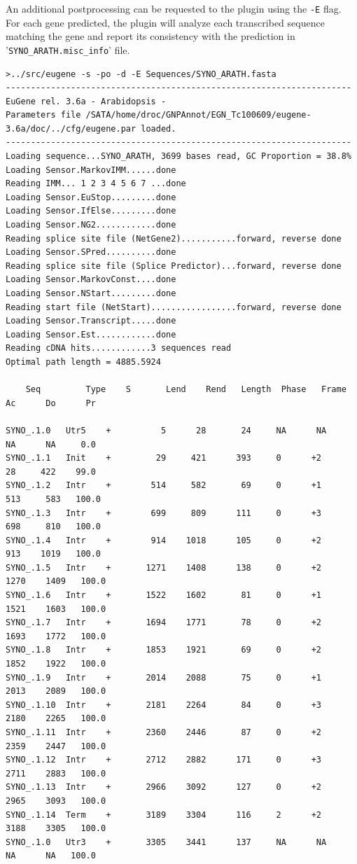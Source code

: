 \documentclass[a4paper,titlepage]{report}
\begin{document}
An additional postprocessing can be requested to the plugin using the
\texttt{-E} flag. For each gene predicted, the plugin will analyze
each transcribed sequence matching the gene and report its consistency
with the prediction in '\texttt{SYNO\_ARATH.misc\_info}' file.

\begin{Verbatim}[fontsize=\scriptsize]
>../src/eugene -s -po -d -E Sequences/SYNO_ARATH.fasta
---------------------------------------------------------------------
EuGene rel. 3.6a - Arabidopsis -
Parameters file /SATA/home/droc/GNPAnnot/EGN_Tc100609/eugene-3.6a/doc/../cfg/eugene.par loaded.
---------------------------------------------------------------------
Loading sequence...SYNO_ARATH, 3699 bases read, GC Proportion = 38.8%
Loading Sensor.MarkovIMM......done
Reading IMM... 1 2 3 4 5 6 7 ...done
Loading Sensor.EuStop.........done
Loading Sensor.IfElse.........done
Loading Sensor.NG2............done
Reading splice site file (NetGene2)...........forward, reverse done
Loading Sensor.SPred..........done
Reading splice site file (Splice Predictor)...forward, reverse done
Loading Sensor.MarkovConst....done
Loading Sensor.NStart.........done
Reading start file (NetStart).................forward, reverse done
Loading Sensor.Transcript.....done
Loading Sensor.Est............done
Reading cDNA hits............3 sequences read
Optimal path length = 4885.5924

    Seq         Type    S       Lend    Rend   Length  Phase   Frame      Ac      Do      Pr

SYNO_.1.0	Utr5    +          5      28       24     NA      NA      NA      NA     0.0  
SYNO_.1.1	Init    +         29     421      393     0      +2      28     422    99.0  
SYNO_.1.2	Intr    +        514     582       69     0      +1     513     583   100.0  
SYNO_.1.3	Intr    +        699     809      111     0      +3     698     810   100.0  
SYNO_.1.4	Intr    +        914    1018      105     0      +2     913    1019   100.0  
SYNO_.1.5	Intr    +       1271    1408      138     0      +2    1270    1409   100.0  
SYNO_.1.6	Intr    +       1522    1602       81     0      +1    1521    1603   100.0  
SYNO_.1.7	Intr    +       1694    1771       78     0      +2    1693    1772   100.0  
SYNO_.1.8	Intr    +       1853    1921       69     0      +2    1852    1922   100.0  
SYNO_.1.9	Intr    +       2014    2088       75     0      +1    2013    2089   100.0  
SYNO_.1.10	Intr    +       2181    2264       84     0      +3    2180    2265   100.0  
SYNO_.1.11	Intr    +       2360    2446       87     0      +2    2359    2447   100.0  
SYNO_.1.12	Intr    +       2712    2882      171     0      +3    2711    2883   100.0  
SYNO_.1.13	Intr    +       2966    3092      127     0      +2    2965    3093   100.0  
SYNO_.1.14	Term    +       3189    3304      116     2      +2    3188    3305   100.0  
SYNO_.1.0	Utr3    +       3305    3441      137     NA      NA      NA      NA   100.0  


\end{Verbatim}
\end{document}
